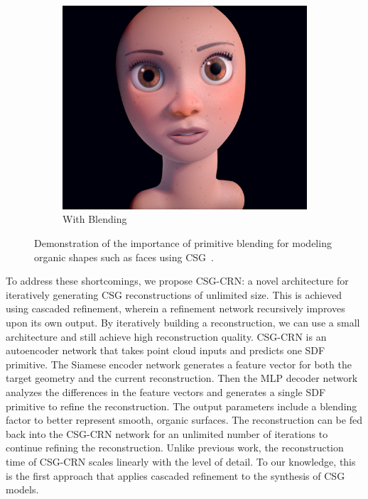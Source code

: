 \begin{figure}[!b]
\begin{subfigure}[t]{0.45\textwidth}
		\includegraphics[width=\textwidth]{Images/Face with blending}
		\caption{With Blending}
	\end{subfigure}
	\caption{Demonstration of the importance of primitive blending for modeling organic shapes such as faces using CSG~\cite{Quilez2013}.}
	\label{fig:primitive_blending}
\end{figure}

To address these shortcomings, we propose CSG-CRN: a novel architecture for iteratively generating CSG reconstructions of unlimited size. This is achieved using cascaded refinement, wherein a refinement network recursively improves upon its own output. By iteratively building a reconstruction, we can use a small architecture and still achieve high reconstruction quality. CSG-CRN is an autoencoder network that takes point cloud inputs and predicts one SDF primitive. The Siamese encoder network generates a feature vector for both the target geometry and the current reconstruction. Then the MLP decoder network analyzes the differences in the feature vectors and generates a single SDF primitive to refine the reconstruction. The output parameters include a blending factor to better represent smooth, organic surfaces. The reconstruction can be fed back into the CSG-CRN network for an unlimited number of iterations to continue refining the reconstruction. Unlike previous work, the reconstruction time of CSG-CRN scales linearly with the level of detail. To our knowledge, this is the first approach that applies cascaded refinement to the synthesis of CSG models.

